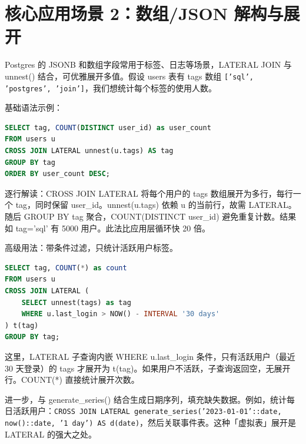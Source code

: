 \chapter{核心应用场景 2：数组/JSON 解构与展开}
Postgres 的 JSONB 和数组字段常用于标签、日志等场景，LATERAL JOIN 与 unnest() 结合，可优雅展开多值。假设 users 表有 tags 数组 \texttt{['sql', 'postgres', 'join']}，我们想统计每个标签的使用人数。\par
基础语法示例：\par
\begin{lstlisting}[language=sql]
SELECT tag, COUNT(DISTINCT user_id) as user_count
FROM users u
CROSS JOIN LATERAL unnest(u.tags) AS tag
GROUP BY tag
ORDER BY user_count DESC;
\end{lstlisting}
逐行解读：CROSS JOIN LATERAL 将每个用户的 tags 数组展开为多行，每行一个 tag，同时保留 user\_{}id。unnest(u.tags) 依赖 u 的当前行，故需 LATERAL。随后 GROUP BY tag 聚合，COUNT(DISTINCT user\_{}id) 避免重复计数。结果如 tag='sql' 有 5000 用户。此法比应用层循环快 20 倍。\par
高级用法：带条件过滤，只统计活跃用户标签。\par
\begin{lstlisting}[language=sql]
SELECT tag, COUNT(*) as count
FROM users u
CROSS JOIN LATERAL (
    SELECT unnest(tags) as tag
    WHERE u.last_login > NOW() - INTERVAL '30 days'
) t(tag)
GROUP BY tag;
\end{lstlisting}
这里，LATERAL 子查询内嵌 WHERE u.last\_{}login 条件，只有活跃用户（最近 30 天登录）的 tags 才展开为 t(tag)。如果用户不活跃，子查询返回空，无展开行。COUNT(*) 直接统计展开次数。\par
进一步，与 generate\_{}series() 结合生成日期序列，填充缺失数据。例如，统计每日活跃用户：\texttt{CROSS JOIN LATERAL generate\_{}series('2023-01-01'::date, now()::date, '1 day') AS d(date)}，然后关联事件表。这种「虚拟表」展开是 LATERAL 的强大之处。\par
